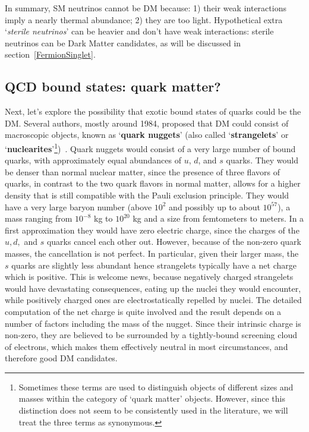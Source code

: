 In summary, SM neutrinos cannot be DM because: 1) their weak interactions imply a nearly thermal abundance; 2) they are too light.
Hypothetical extra `{\em sterile neutrinos}' can be heavier and don't have weak interactions: 
sterile neutrinos can be Dark Matter candidates, as will be discussed in section~\ref{FermionSinglet}.



\subsection{QCD bound states: quark matter?} 
\label{sec:quarkmatter}
Next, let's explore the possibility that exotic bound states of quarks could be the DM.
Several authors, mostly around 1984, proposed that DM could consist of macroscopic objects, known as   `{\bf quark nuggets}' (also called `{\bf strangelets}' or `{\bf nuclearites}'\footnote{Sometimes these terms are used  to distinguish objects of different sizes and masses within the category of `quark matter' objects. However, since this distinction does not seem to be consistently used in the literature, we will treat the three terms as synonymous.})~\cite{quark:matter:DM}.
Quark nuggets would consist of a very large number of bound quarks, with approximately equal abundances of $u$, $d$, and $s$ quarks. They would be denser than normal nuclear matter, since the presence of three flavors of quarks, in contrast to the two quark flavors in normal matter, allows for a higher density that is still compatible with the Pauli exclusion principle. They would have a very large baryon number (above $10^2$ and possibly up to about $10^{57}$), a mass ranging from $10^{-8}$ kg to $10^{20}$ kg and a size from femtometers to meters. 
In a first approximation they would have zero electric charge, since the charges of the $u,d,$ and $s$ quarks cancel each other out. However, because of the non-zero quark masses, the cancellation is not perfect. In particular, given their larger mass, the $s$ quarks are slightly less abundant hence strangelets typically have a net charge which is positive. This is welcome news, because negatively charged strangelets would have devastating consequences, eating up the nuclei they would encounter, while positively charged ones are electrostatically repelled by nuclei. The detailed computation of the net charge is quite involved and the result depends on a number of factors including the mass of the nugget. Since their intrinsic charge is non-zero, they are believed to be surrounded by a tightly-bound screening cloud of electrons,
which makes them effectively neutral in most circumstances, and therefore good DM candidates.

